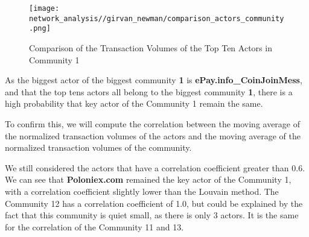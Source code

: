 \documentclass[a4paper, 12pt]{article}
\begin{document}
\begin{figure}[h]
    \centering
    \texttt{[image: network\_analysis//girvan\_newman/comparison\_actors\_community.png]}
    \caption{Comparison of the Transaction Volumes of the Top Ten Actors in Community 1}
\end{figure}

As the biggest actor of the biggest community \textbf{1} is \textbf{ePay.info\_CoinJoinMess}, and that the top tens actors all 
belong to the biggest community \textbf{1}, there is a high probability that key actor of the Community 1 remain the same.

To confirm this, we will compute the correlation between the moving average of the normalized transaction volumes of the actors
and the moving average of the normalized transaction volumes of the community.

\begin{table}[!htb]
    \begin{minipage}{0.5\linewidth}
        \centering
        \caption{Correlation Between Moving Average of Normalized Transaction Volumes}
        \label{tab:louvain_correlation_matrix}
    \end{minipage}%
    \hspace{0.05\linewidth} %
    \begin{minipage}{0.45\linewidth}
        We still considered the actors that have a correlation coefficient greater than 0.6.
        We can see that \textbf{Poloniex.com} remained the key actor of the Community 1, with a correlation coefficient slightly lower than the Louvain method.
        The Community 12 has a correlation coefficient of 1.0, but could be explained by the fact that this community is quiet small, as there is only 3 actors. It is the same for the correlation of the Community 11 and 13.
    \end{minipage}
\end{table}
\end{document}

